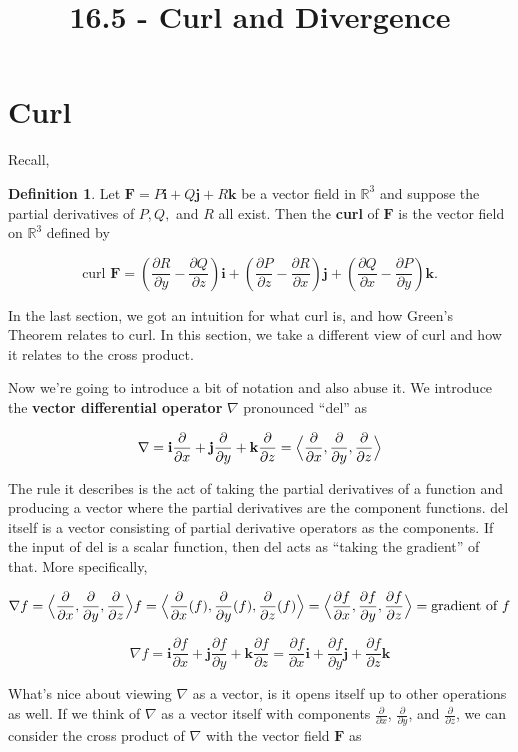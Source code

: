 \documentclass[11pt,oneside,english]{amsart}
\theoremstyle{definition}
\newtheorem*{definition}{Definition}
\newcommand{\R}{\mathbb{R}}
\newcommand{\pp}[2]{\frac{\partial{#1}}{\partial{#2}}}
\begin{document}
\vspace*{-1cm}
\title{16.5 - Curl and Divergence}
\maketitle




\section*{Curl}

Recall,

\begin{definition}
Let $\mathbf{F}=P\mathbf{i}+Q\mathbf{j}+R\mathbf{k}$ be a vector field in $\R^3$ and suppose the partial derivatives of $P,Q,$ and $R$ all exist. Then the \textbf{curl} of $\mathbf{F}$ is the vector field on $\R^3$ defined by

\[
\text{curl }\mathbf{F}=\left(\pp{R}{y}-\pp{Q}{z}\right)\mathbf{i}+\left(\pp{P}{z}-\pp{R}{x}\right)\mathbf{j}+\left(\pp{Q}{x}-\pp{P}{y}\right)\mathbf{k}.
\]
\end{definition}


In the last section, we got an intuition for what curl is, and how Green's Theorem relates to curl. In this section, we take a different view of curl and how it relates to the cross product.

Now we're going to introduce a bit of notation and also abuse it. We introduce the \textbf{vector differential operator} $\nabla$ pronounced ``del'' as

\[
\nabla =\mathbf{i}\pp{}{x}+\mathbf{j}\pp{}{y}+\mathbf{k}\pp{}{z}=\Bigl<\pp{}{x},\pp{}{y},\pp{}{z}\Bigr>
\]

The rule it describes is the act of taking the partial derivatives of a function and producing a vector where the partial derivatives are the component functions. del itself is a vector consisting of partial derivative operators as the components. If the input of del is a scalar function, then del acts as ``taking the gradient'' of that. More specifically, 

\[
\nabla f=\Bigl<\pp{}{x},\pp{}{y},\pp{}{z}\Bigr>f=\Bigl<\pp{}{x}(f),\pp{}{y}(f),\pp{}{z}(f)\Bigr>=\Bigl<\pp{f}{x},\pp{f}{y},\pp{f}{z}\Bigr>=\text{gradient of $f$}
\]

\[
\nabla f=\mathbf{i}\pp{f}{x}+\mathbf{j}\pp{f}{y}+\mathbf{k}\pp{f}{z}=\pp{f}{x}\mathbf{i}+\pp{f}{y}\mathbf{j}+\pp{f}{z}\mathbf{k}
\]

What's nice about viewing $\nabla$ as a vector, is it opens itself up to other operations as well. If we think of $\nabla$ as a vector itself with components $\pp{}{x}$, $\pp{}{y}$, and $\pp{}{z}$, we can consider the cross product of $\nabla$ with the vector field $\mathbf{F}$ as
\end{document}
